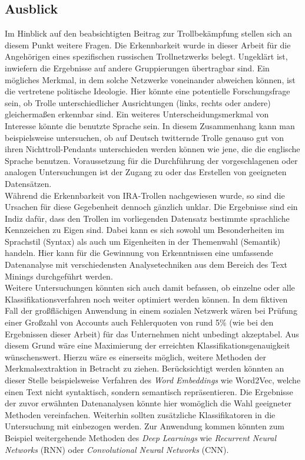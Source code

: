 \subsection{Ausblick}
Im Hinblick auf den beabsichtigten Beitrag zur Trollbekämpfung stellen sich an diesem Punkt weitere Fragen. Die Erkennbarkeit wurde in dieser Arbeit für die Angehörigen eines spezifischen russischen Trollnetzwerks belegt. Ungeklärt ist, inwiefern die Ergebnisse auf andere Gruppierungen übertragbar sind. Ein mögliches Merkmal, in dem solche Netzwerke voneinander abweichen können, ist die vertretene politische Ideologie. Hier könnte eine potentielle Forschungsfrage sein, ob Trolle unterschiedlicher Ausrichtungen (links, rechts oder andere) gleichermaßen erkennbar sind. Ein weiteres Unterscheidungsmerkmal von Interesse könnte die benutzte Sprache sein. In diesem Zusammenhang kann man beispielsweise untersuchen, ob auf Deutsch twitternde Trolle genauso gut von ihren Nichttroll-Pendants unterschieden werden können wie jene, die die englische Sprache benutzen. Voraussetzung für die Durchführung der vorgeschlagenen oder analogen Untersuchungen ist der Zugang zu oder das Erstellen von geeigneten Datensätzen.\\
Während die Erkennbarkeit von IRA-Trollen nachgewiesen wurde, so sind die Ursachen für diese Gegebenheit dennoch gänzlich unklar. Die Ergebnisse sind ein Indiz dafür, dass den Trollen im vorliegenden Datensatz bestimmte sprachliche Kennzeichen zu Eigen sind. Dabei kann es sich sowohl um Besonderheiten im Sprachstil (Syntax) als auch um Eigenheiten in der Themenwahl (Semantik) handeln. Hier kann für die Gewinnung von Erkenntnissen eine umfassende Datenanalyse mit verschiedensten Analysetechniken aus dem Bereich des Text Minings durchgeführt werden.\\
Weitere Untersuchungen könnten sich auch damit befassen, ob einzelne oder alle Klassifikationsverfahren noch weiter optimiert werden können. In dem fiktiven Fall der großflächigen Anwendung in einem sozialen Netzwerk wären bei Prüfung einer Großzahl von Accounts auch Fehlerquoten von rund 5\% (wie bei den Ergebnissen dieser Arbeit) für das Unternehmen nicht unbedingt akzeptabel. Aus diesem Grund wäre eine Maximierung der erreichten Klassifikationsgenauigkeit wünschenswert. Hierzu wäre es einerseits möglich, weitere Methoden der Merkmalsextraktion in Betracht zu ziehen. Berücksichtigt werden könnten an dieser Stelle beispielsweise Verfahren des \textit{Word Embeddings} wie Word2Vec, welche einen Text nicht syntaktisch, sondern semantisch repräsentieren. Die Ergebnisse der zuvor erwähnten Datenanalysen könnte hier womöglich die Wahl geeigneter Methoden vereinfachen. Weiterhin sollten zusätzliche Klassifikatoren in die Untersuchung mit einbezogen werden. Zur Anwendung kommen könnten zum Beispiel weitergehende Methoden des \textit{Deep Learnings} wie \textit{Recurrent Neural Networks} (RNN) oder \textit{Convolutional Neural Networks} (CNN).